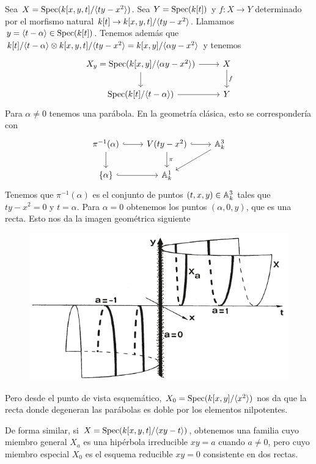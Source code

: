 \documentclass[GA.tex]{subfiles}
\begin{document}
\begin{ej}
Sea $X=\operatorname{Spec}(k[x,y,t]/\langle{ty-x^2}\rangle)$. Sea $Y=\operatorname{Spec}(k[t])$ y $f:X\to Y$ determinado por el morfismo natural $k[t]\to k[x,y,t]/\langle{ty-x^2}\rangle$. Llamamos $y=\langle{t-\alpha}\rangle\in\operatorname{Spec}(k[t])$. Tenemos además que $k[t]/\langle{t-\alpha}\rangle\otimes k[x,y,t]/\langle{ty-x^2}\rangle=k[x,y]/\langle{\alpha y-x^2}\rangle$ y tenemos
\[
\begin{tikzcd}
X_y=\spec(k[x,y]/\gene{\alpha y-x^2})\arrow[r] \arrow[d]  & X\arrow[d, "f"]\\
\spec(k[t]/\gene{t-\alpha})\arrow[r] & Y
\end{tikzcd}
\]
Para $\alpha\neq 0$ tenemos una parábola. En la geometría clásica, esto se correspondería con
\[
\begin{tikzcd}
\pi^{-1}(\alpha)\arrow[d]\arrow[r, hookrightarrow] & V(ty-x^2)\arrow[r, hookrightarrow]\arrow[d,"\pi"] & \A^3_k\arrow[dl]\\
\{\alpha\} \arrow[r, hookrightarrow] & \A^1_k & 
\end{tikzcd}
\]
Tenemos que $\pi^{-1}(\alpha)$ es el conjunto de puntos $(t,x,y)\in\mathbb{A}_k^3$ tales que $ty-x^2=0$ y $t=\alpha$. Para $\alpha=0$ obtenemos los puntos $(\alpha,0,y)$, que es una recta. Esto nos da la imagen geométrica siguiente
\begin{figure}[h!]
\includegraphics[scale=0.5]{3-3-1}
\end{figure}

Pero desde el punto de vista esquemático, $X_0=\operatorname{Spec}(k[x,y]/\langle{x^2}\rangle)$ nos da que la recta donde degeneran las parábolas es doble por los elementos nilpotentes. 
\end{ej}

\begin{ej}
De forma similar, si $X=\operatorname{Spec}(k[x,y,t]/\langle{xy-t}\rangle)$, obtenemos una familia cuyo miembro general $X_a$ es una hipérbola irreducible $xy=a$ cuando $a\neq 0$, pero cuyo miembro especial $X_0$ es el esquema reducible $xy=0$ consistente en dos rectas.
\end{ej}
\end{document}
